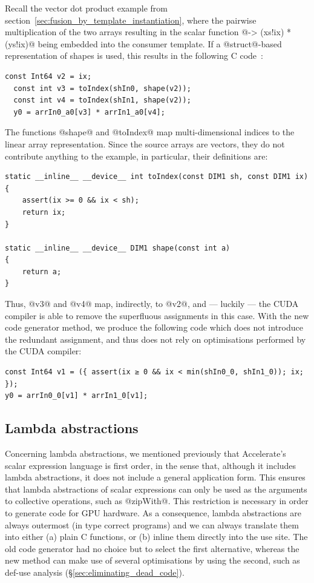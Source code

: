 Recall the vector dot product example from
section~\ref{sec:fusion_by_template_instantiation}, where the pairwise
multiplication of the two arrays resulting in the scalar function
@\ix -> (xs!ix) * (ys!ix)@ being embedded into the consumer template. If a
@struct@-based representation of shapes is used, this results in the following
C code~\cite{CliftonEverest:2014vi}:
%
\begin{lstlisting}[style=cuda]
  const Int64 v2 = ix;
  const int v3 = toIndex(shIn0, shape(v2));
  const int v4 = toIndex(shIn1, shape(v2));
  y0 = arrIn0_a0[v3] * arrIn1_a0[v4];
\end{lstlisting}
%
The functions @shape@ and @toIndex@ map multi-dimensional indices to the linear
array representation. Since the source arrays are vectors, they do not
contribute anything to the example, in particular, their definitions are:
%
\begin{lstlisting}[style=cuda]
static __inline__ __device__ int toIndex(const DIM1 sh, const DIM1 ix)
{
    assert(ix >= 0 && ix < sh);
    return ix;
}

static __inline__ __device__ DIM1 shape(const int a)
{
    return a;
}
\end{lstlisting}
%
Thus, @v3@ and @v4@ map, indirectly, to @v2@, and --- luckily --- the CUDA
compiler is able to remove the superfluous assignments in this case. With the
new code generator method, we produce the following code which does not
introduce the redundant assignment, and thus does not rely on optimisations
performed by the CUDA compiler:
%
\begin{lstlisting}[style=cuda]
const Int64 v1 = ({ assert(ix ≥ 0 && ix < min(shIn0_0, shIn1_0)); ix; });
y0 = arrIn0_0[v1] * arrIn1_0[v1];
\end{lstlisting}


\subsection{Lambda abstractions}

Concerning lambda abstractions, we mentioned previously that Accelerate's scalar
expression language is first order, in the sense that, although it includes
lambda abstractions, it does not include a general application form. This
ensures that lambda abstractions of scalar expressions can only be used as the
arguments to collective operations, such as @zipWith@. This restriction is
necessary in order to generate code for GPU hardware. As a consequence, lambda
abstractions are always outermost (in type correct programs) and we can always
translate them into either (a) plain C functions, or (b) inline them directly
into the use site. The old code generator had no choice but to select the first
alternative, whereas the new method can make use of several optimisations by
using the second, such as def-use analysis (\S\ref{sec:eliminating_dead_code}).

